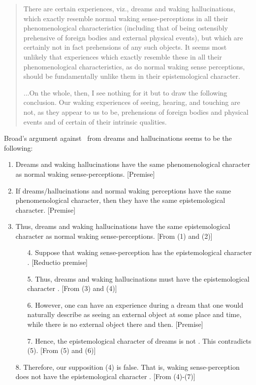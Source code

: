 \begin{quote}
There are certain experiences, viz., dreams and waking hallucinations, which exactly resemble normal waking sense-perceptions in all their phenomenological characteristics (including that of being ostensibly prehensive of foreign bodies and external physical events), but which are certainly not in fact prehensions of any such objects. It seems most unlikely that experiences which exactly resemble these in all their phenomenological characteristics, as do normal waking sense perceptions, should be fundamentally unlike them in their epistemological character.

...On the whole, then, I see nothing for it but to draw the following conclusion. Our waking experiences of seeing, hearing, and touching are not, as they appear to us to be, prehensions of foreign bodies and physical events and of certain of their intrinsic qualities.\cite[p. 41]{Broad:1952}
\end{quote}
Broad's argument against \PRO\ from dreams and hallucinations seems to be the following:

\begin{enumerate}

\item Dreams and waking hallucinations have the same phenomenological character as normal waking sense-perceptions. [Premise]
\item If dreams/hallucinations and normal waking perceptions have the same phenomenological character, then they have the same epistemological character. [Premise]
\item Thus, dreams and waking hallucinations have the same epistemological character as normal waking sense-perceptions. [From (1) and (2)]
\begin{enumerate}
\item[4.] Suppose that waking sense-perception has the epistemological character \PRO. [Reductio premise]
\item[5.] Thus, dreams and waking hallucinations must have the epistemological character \PRO. [From (3) and (4)]
\item[6.] However, one can have an experience during a dream that one would naturally describe as seeing an external object at some place and time, while there is no external object there and then. [Premise]
\item[7.] Hence, the epistemological character of dreams is not \PRO. This contradicts (5). [From (5) and (6)]
\end{enumerate}
\item[8.] Therefore, our supposition (4) is false. That is, waking sense-perception does not have the epistemological character \PRO. [From (4)-(7)]
\end{enumerate}

